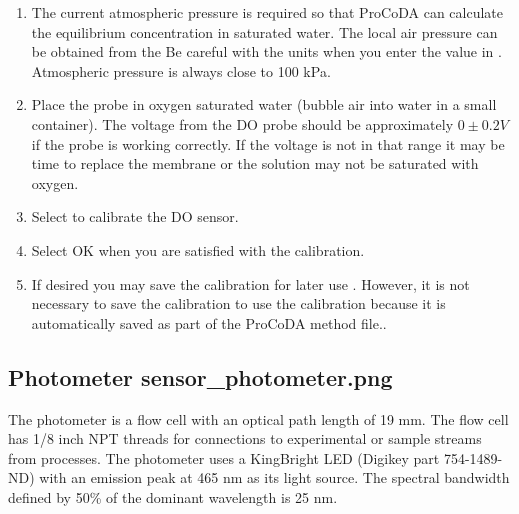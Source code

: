 \documentclass[letterpaper,10pt,english]{sphinxmanual}
\begin{document}
\begin{enumerate}
\item {} 
The current atmospheric pressure is required so that ProCoDA can calculate the equilibrium concentration in saturated water. The local air pressure can be obtained from the  Be careful with the units when you enter the value in . Atmospheric pressure is always close to 100 kPa.

\item {} 
Place the probe in oxygen saturated water (bubble air into water in a small container).  The voltage from the DO probe should be approximately \(0 \pm 0.2 V\) if the probe is working correctly. If the voltage is not in that range it may be time to replace the membrane or the solution may not be saturated with oxygen.

\item {} 
Select  to calibrate the DO sensor.

\item {} 
Select OK when you are satisfied with the calibration.

\item {} 
If desired you may save the calibration for later use . However, it is not necessary to save the calibration to use the calibration because it is automatically saved as part of the ProCoDA method file..

\end{enumerate}


\subsection[Photometer]{Photometer \lowercase{\sphinxincludegraphics}{{sensor_photometer}.png}}
\label{\detokenize{ProCoDA/ProCoDA:photometer-sensor-photometer}}\label{\detokenize{ProCoDA/ProCoDA:heading-procoda-photometer}}
The photometer is a flow cell with an optical path length of 19 mm. The flow cell has 1/8 inch NPT threads for connections to experimental or sample streams from processes. The photometer uses a KingBright LED (Digikey part 754-1489-ND) with an emission peak at 465 nm as its light source. The spectral bandwidth defined by 50\% of the dominant wavelength is 25 nm.

%
\begin{sphinxVerbatim}[commandchars=\\\{\}]
     
   
    
\end{sphinxVerbatim}
\end{document}
